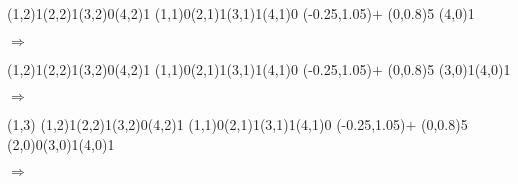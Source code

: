 \documentclass[11pt,a4paper]{article}
\begin{document}
\begin{center}

\begin{table}[ht!]
  \centering
  \begin{minipage}{0.15\textwidth}

\par\vspace{3\oplineheight}
\oplput(1,2){1}\oplput(2,2){1}\oplput(3,2){0}\oplput(4,2){1}
\oplput(1,1){0}\oplput(2,1){1}\oplput(3,1){1}\oplput(4,1){0}
\oplput(-0.25,1.05){$+$}
\ophline(0,0.8){5}
\oplput(4,0){1}

  \end{minipage}
  \hfillx
  \begin{minipage}{0.1\textwidth}

$ \Rightarrow $

  \end{minipage}
  \hfillx
  \begin{minipage}{0.15\textwidth}

\par\vspace{3\oplineheight}
\oplput(1,2){1}\oplput(2,2){1}\oplput(3,2){0}\oplput(4,2){1}
\oplput(1,1){0}\oplput(2,1){1}\oplput(3,1){1}\oplput(4,1){0}
\oplput(-0.25,1.05){$+$}
\ophline(0,0.8){5}
\oplput(3,0){1}\oplput(4,0){1}

  \end{minipage}
  \hfillx
  \begin{minipage}{0.1\textwidth}

$ \Rightarrow $

  \end{minipage}
  \hfillx
  \begin{minipage}{0.15\textwidth}

\par\vspace{3\oplineheight}
\oplput(1,3){\tiny {}}
\oplput(1,2){1}\oplput(2,2){1}\oplput(3,2){0}\oplput(4,2){1}
\oplput(1,1){0}\oplput(2,1){1}\oplput(3,1){1}\oplput(4,1){0}
\oplput(-0.25,1.05){$+$}
\ophline(0,0.8){5}
\oplput(2,0){0}\oplput(3,0){1}\oplput(4,0){1}

  \end{minipage}
  \hfillx
  \begin{minipage}{0.1\textwidth}

$ \Rightarrow $

  \end{minipage}
  \hfillx
  \begin{minipage}{0.15\textwidth}


\end{minipage}
\end{table}
\end{center}
\end{document}
